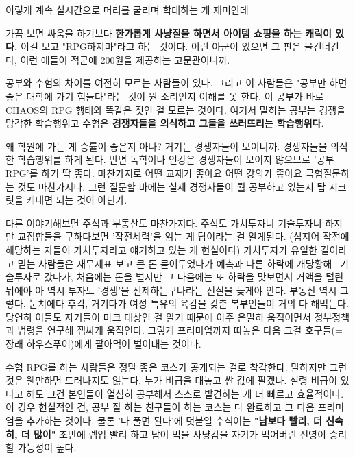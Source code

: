 이렇게 계속 실시간으로 머리를 굴리며 학대하는 게 재미인데
\vspace{5mm}

가끔 보면 싸움을 하기보다 \textbf{한가롭게 사냥질을 하면서 아이템 쇼핑을 하는 캐릭이 있다.}
이걸 보고 "RPG하지마"라고 하는 것이다. 이런 아군이 있으면 그 판은 물건너간다,
이런 애들이 적군에 200원을 제공하는 고문관이니까.
\vspace{5mm}

공부와 수험의 차이를 여전히 모르는 사람들이 있다.
그리고 이 사람들은 "공부만 하면 좋은 대학에 가기 힘들다"라는 것이 뭔 소리인지 이해를 못 한다.
이 공부가 바로 CHAOS의 RPG 행태와 똑같은 짓인 걸 모르는 것이다.
여기서 말하는 공부는 경쟁을 망각한 학습행위고
수험은 \textbf{경쟁자들을 의식하고 그들을 쓰러뜨리는 학습행위다}.
\vspace{5mm}

왜 학원에 가는 게 승률이 좋은지 아나? 거기는 경쟁자들이 보이니까. 경쟁자들을 의식한 학습행위를 하게 된다.
반면 독학이나 인강은 경쟁자들이 보이지 않으므로 '공부 RPG'를 하기 딱 좋다.
마찬가지로 어떤 교재가 좋아요 어떤 강의가 좋아요 극혐질문하는 것도 마찬가지다.
그런 질문할 바에는 실제 경쟁자들이 뭘 공부하고 있는지 탑 시크릿을 캐내면 되는 것이 아닌가.
\vspace{5mm}

다른 이야기해보면 주식과 부동산도 마찬가지다.
주식도 가치투자니 기술투자니 하지만 교집합들을 구하다보면 '작전세력'을 읽는 게 답이라는 걸 알게된다.
(심지어 작전에 해당하는 자들이 가치투자라고 얘기하고 있는 게 현실이다)
가치투자가 유일한 길이라고 믿는 사람들은 재무제표 보고 큰 돈 묻어두었다가 예측과 다른 하락에 개당황해  기술투자로 갔다가,
처음에는 돈을 벌지만 그 다음에는 또 하락을 맛보면서 거액을 털린 뒤에야 아 역시 투자도 '경쟁'을 전제하는구나라는 진실을 늦게야 안다.
부동산 역시 그렇다, 눈치에다 후각, 거기다가 여성 특유의 육감을 갖춘 복부인들이 거의 다 해먹는다.
당연히 이들도 자기들이 마크 대상인 걸 알기 때문에 아주 은밀히 움직이면서 정부정책과 법령을 연구해 잽싸게 움직인다.
그렇게 프리미엄까지 따놓은 다음 그걸 호구들(=장래 하우스푸어)에게 팔아먹어 벌어대는 것이다.
\vspace{5mm}

수험 RPG를 하는 사람들은 정말 좋은 코스가 공개되는 걸로 착각한다.
말하지만 그런 것은 웬만하면 드러나지도 않는다, 누가 비급을 대놓고 싼 값에 팔겠나.
설령 비급이 있다고 해도 그건 본인들이 열심히 공부해서 스스로 발견하는 게 더 빠르고 효율적이다.
이 경우 현실적인 건, 공부 잘 하는 친구들이 하는 코스는 다 완료하고 그 다음 프리미엄을 추가하는 것이다.
물론 '다 풀면 된다'에 덧붙일 수식어는 \textbf{"남보다 빨리, 더 신속히, 더 많이"}
초반에 렙업 빨리 하고 남이 먹을 사냥감을 자기가 먹어버린 진영이 승리할 가능성이 높다.
\vspace{5mm}

